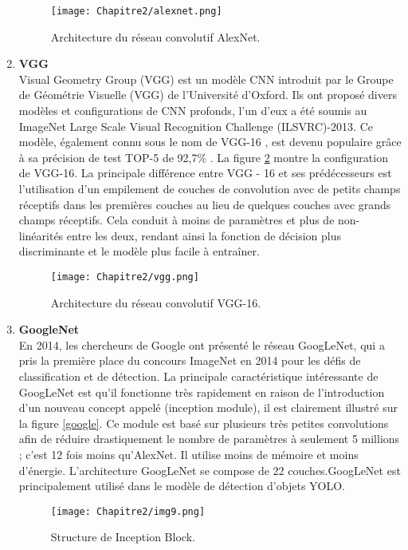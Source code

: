 \begin{enumerate}
\begin{figure}[H]
\centering
\texttt{[image: Chapitre2/alexnet.png]}
\caption{Architecture du réseau convolutif AlexNet. \cite{alexnet}}
\label{alexnet}
\end{figure} 
\item \textbf{VGG}\cite{vgg}\\
Visual Geometry Group (VGG) est un modèle CNN introduit par le Groupe de Géométrie Visuelle (VGG) de l'Université d'Oxford. Ils ont proposé divers modèles et configurations de CNN profonds, l'un d'eux a été soumis au ImageNet Large Scale Visual Recognition Challenge (ILSVRC)-2013. Ce modèle, également connu sous le nom de VGG-16 , est devenu populaire grâce à sa précision  de test TOP-5 de 92,7\% . 
La figure \ref{vgg} montre la configuration de VGG-16. La principale différence entre VGG - 16 et ses prédécesseurs est l'utilisation d'un empilement de couches de convolution avec de petits champs réceptifs  dans les premières couches au lieu de quelques couches avec grands champs réceptifs. Cela conduit à moins de paramètres et plus de non-linéarités entre les deux, rendant ainsi la fonction de décision plus discriminante et le modèle plus facile à entraîner.
\begin{figure}[H]
\centering
\texttt{[image: Chapitre2/vgg.png]}
\caption{Architecture du réseau convolutif VGG-16. }
\label{vgg}
\end{figure} 
\item \textbf{GoogleNet}\cite{google}\\
En 2014, les chercheurs de Google ont présenté le réseau GoogLeNet, qui a pris la première place du concours ImageNet en 2014 pour les défis de classification et de détection. La principale caractéristique intéressante de GoogLeNet est qu'il fonctionne très rapidement en raison de l'introduction d'un nouveau concept appelé (inception module), il est clairement illustré sur la figure \ref{google}. Ce module est basé sur plusieurs très petites convolutions afin de réduire drastiquement le nombre de paramètres à seulement 5 millions ; c'est 12 fois moins qu'AlexNet. Il utilise moins de mémoire et moins d'énergie. L'architecture GoogLeNet se compose de 22 couches.GoogLeNet est principalement utilisé dans le modèle de détection d'objets YOLO.
\begin{figure}[H]
 \centering
\texttt{[image: Chapitre2/img9.png]}
\caption{Structure de Inception Block.}
 \label{img9}
 \end{figure}


\end{enumerate}
